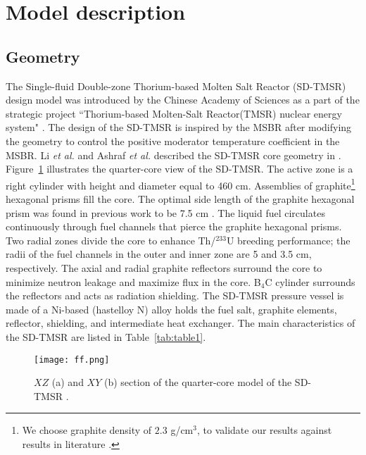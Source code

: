 \section{Model description} \label{Model-description}
\subsection{Geometry}
The Single-fluid Double-zone Thorium-based Molten Salt Reactor (SD-TMSR) design model was introduced by the Chinese Academy of Sciences as a part of  
the strategic project ``Thorium-based Molten-Salt Reactor(TMSR) nuclear energy system" 
\cite{jiang2012advanced,li2015analysis,li_optimization_2018}. The 
design of the \gls{SD-TMSR} is inspired by the \gls{MSBR} 
\cite{robertson_conceptual_1971} after modifying the geometry to 
control the positive moderator temperature coefficient in the MSBR. Li \emph{et al.} and Ashraf \emph{et al.} 
described the \gls{SD-TMSR} core 
geometry in \cite{li_optimization_2018,ashraf2019whole_core}. 
Figure~\ref{fig:ff} illustrates the quarter-core view of the 
\gls{SD-TMSR}.
The active zone is a right cylinder with height and diameter 
equal to 460 cm. Assemblies of graphite\footnote{We choose graphite density of 
$2.3$ g/cm$^3$, to validate our results against results in literature 
\cite{li_optimization_2018,nuttin2005potential}.} hexagonal prisms fill the 
core. The optimal side length of the graphite hexagonal prism was found in previous work to be 7.5 cm \cite{li_optimization_2018}. The liquid fuel circulates 
continuously through fuel channels that pierce the graphite hexagonal 
prisms. Two radial zones divide the core to enhance 
Th/$^{233}$U breeding performance; the radii of the fuel channels in the 
outer and inner zone are 5 and 3.5 cm, respectively. The axial and radial 
graphite reflectors surround the core to minimize neutron leakage and 
maximize flux in the core. B${_4}$C cylinder surrounds the reflectors and 
acts as radiation shielding. The \gls{SD-TMSR} pressure vessel is made of a Ni-based (hastelloy N) alloy holds 
the fuel salt, graphite elements, reflector, shielding, and intermediate heat exchanger. The main 
characteristics of the \gls{SD-TMSR} are listed in Table~\ref{tab:table1}.

\begin{figure} %
	\texttt{[image: ff.png]}
	\caption{$XZ$ (a) and $XY$ (b) section of the quarter-core model of the 
	SD-TMSR \cite{ashraf2019Preliminary}.}
	\label{fig:ff}
\end{figure}


